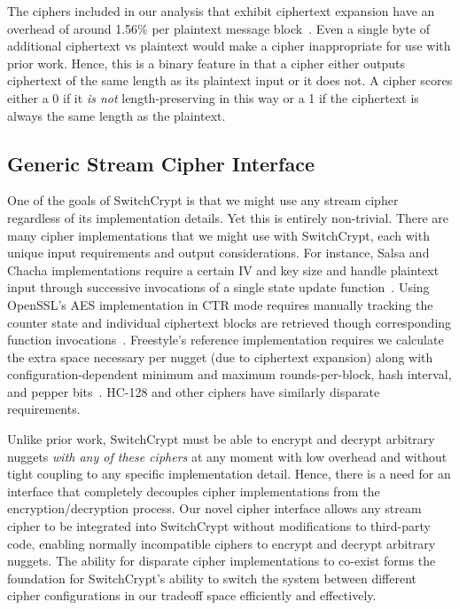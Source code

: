 The ciphers included in our analysis that exhibit ciphertext expansion have an
overhead of around 1.56\% per plaintext message block~\cite{Freestyle}. Even a
single byte of additional ciphertext vs plaintext would make a cipher
inappropriate for use with prior work. Hence, this is a binary feature in that a
cipher either outputs ciphertext of the same length as its plaintext input or it
does not. A cipher scores either a 0 if it \emph{is not} length-preserving in
this way or a 1 if the ciphertext is always the same length as the plaintext.

\subsection{Generic Stream Cipher Interface} \label{subsec:interface}

One of the goals of SwitchCrypt is that we might use any stream cipher
regardless of its implementation details. Yet this is entirely non-trivial.
There are many cipher implementations that we might use with SwitchCrypt, each
with unique input requirements and output considerations. For instance, Salsa
and Chacha implementations require a certain IV and key size and handle
plaintext input through successive invocations of a single state update
function~\cite{Floodyberry}. Using OpenSSL's AES implementation in CTR mode
requires manually tracking the counter state and individual ciphertext blocks
are retrieved though corresponding function invocations~\cite{OpenSSL}.
Freestyle's reference implementation requires we calculate the extra space
necessary per nugget (due to ciphertext expansion) along with
configuration-dependent minimum and maximum rounds-per-block, hash interval, and
pepper bits~\cite{Freestyle}. HC-128 and other ciphers have similarly disparate
requirements.

Unlike prior work, SwitchCrypt must be able to encrypt and decrypt arbitrary
nuggets \emph{with any of these ciphers} at any moment with low overhead and
without tight coupling to any specific implementation detail. Hence, there is a
need for an interface that completely decouples cipher implementations from the
encryption/decryption process. Our novel cipher interface allows any stream
cipher to be integrated into SwitchCrypt without modifications to third-party
code, enabling normally incompatible ciphers to encrypt and decrypt arbitrary
nuggets. The ability for disparate cipher implementations to co-exist forms the
foundation for SwitchCrypt's ability to switch the system between different
cipher configurations in our tradeoff space efficiently and effectively.

